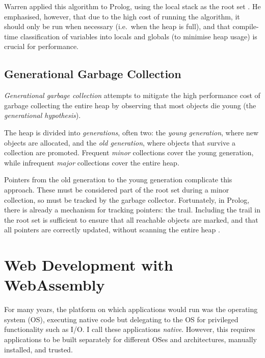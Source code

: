 Warren applied this algorithm to Prolog, using the local stack as the root set \cite{warrenImplementingPrologCompiling1977}. He emphasised, however, that due to the high cost of running the algorithm, it should only be run when necessary (i.e.\ when the heap is full), and that compile-time classification of variables into locals and globals (to minimise heap usage) is crucial for performance.

\subsection{Generational Garbage Collection}

\label{sec:generational-gc}

\emph{Generational garbage collection} attempts to mitigate the high performance cost of garbage collecting the entire heap by observing that most objects die young (the \emph{generational hypothesis}).

The heap is divided into \emph{generations}, often two: the \emph{young generation}, where new objects are allocated, and the \emph{old generation}, where objects that survive a collection are promoted. Frequent \emph{minor} collections cover the young generation, while infrequent \emph{major} collections cover the entire heap.

Pointers from the old generation to the young generation complicate this approach. These must be considered part of the root set during a minor collection, so must be tracked by the garbage collector. Fortunately, in Prolog, there is already a mechanism for tracking pointers: the trail. Including the trail in the root set is sufficient to ensure that all reachable objects are marked, and that all pointers are correctly updated, without scanning the entire heap \cite{bekkersDynamicMemoryManagement1992}.

\section{Web Development with WebAssembly}

\label{sec:webdev}

For many years, the platform on which applications would run was the operating system (OS), executing native code but delegating to the OS for privileged functionality such as I/O. I call these applications \emph{native}. However, this requires applications to be built separately for different OSes and architectures, manually installed, and trusted.

